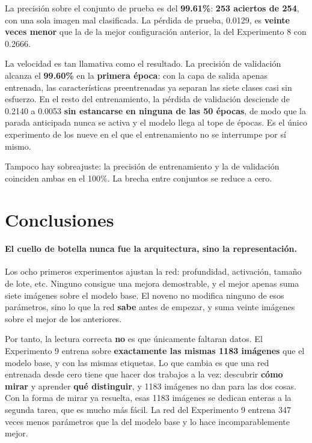 \documentclass[11pt, a4paper]{article}
\begin{document}
La precisión sobre el conjunto de prueba es del \textbf{99.61\%}: \textbf{253 aciertos de 254}, con una sola imagen mal clasificada. La pérdida de prueba, 0.0129, es \textbf{veinte veces menor} que la de la mejor configuración anterior, la del Experimento 8 con 0.2666.

La velocidad es tan llamativa como el resultado. La precisión de validación alcanza el \textbf{99.60\%} en la \textbf{primera época}: con la capa de salida apenas entrenada, las características preentrenadas ya separan las siete clases casi sin esfuerzo. En el resto del entrenamiento, la pérdida de validación desciende de 0.2140 a 0.0053 \textbf{sin estancarse en ninguna de las 50 épocas}, de modo que la parada anticipada nunca se activa y el modelo llega al tope de épocas. Es el único experimento de los nueve en el que el entrenamiento no se interrumpe por sí mismo.

Tampoco hay sobreajuste: la precisión de entrenamiento y la de validación coinciden ambas en el 100\%. La brecha entre conjuntos se reduce a cero.

\section{Conclusiones}

\paragraph{El cuello de botella nunca fue la arquitectura, sino la representación.}
Los ocho primeros experimentos ajustan la red: profundidad, activación, tamaño de lote, etc. Ninguno consigue una mejora demostrable, y el mejor apenas suma siete imágenes sobre el modelo base. El noveno no modifica ninguno de esos parámetros, sino lo que la red \textbf{sabe} antes de empezar, y suma veinte imágenes sobre el mejor de los anteriores.

Por tanto, la lectura correcta \textbf{no} es que únicamente faltaran datos. El Experimento 9 entrena sobre \textbf{exactamente las mismas 1183 imágenes} que el modelo base, y con las mismas etiquetas. Lo que cambia es que una red entrenada desde cero tiene que hacer dos trabajos a la vez: descubrir \textbf{cómo mirar} y aprender \textbf{qué distinguir}, y 1183 imágenes no dan para las dos cosas. Con la forma de mirar ya resuelta, esas 1183 imágenes se dedican enteras a la segunda tarea, que es mucho más fácil. La red del Experimento 9 entrena 347 veces menos parámetros que la del modelo base y lo hace incomparablemente mejor.
\end{document}
